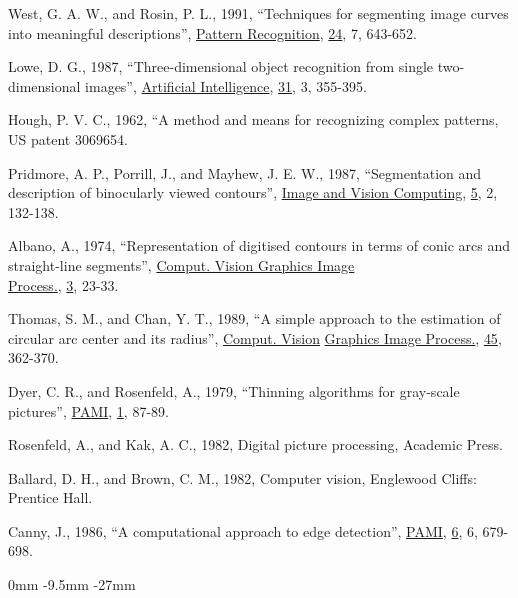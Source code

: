 \begin{thebibliography}{unsrt}

West, G. A. W., and Rosin, P. L., 1991, ``Techniques for segmenting image
curves into meaningful descriptions'', \underline{Pattern Recognition},
\underline{24}, 7, 643-652.

Lowe, D. G., 1987, ``Three-dimensional object recognition from single 
two-dimensional images'', \underline{Artificial Intelligence}, \underline{31}, 
3, 355-395.

Hough, P. V. C., 1962, ``A method and means for recognizing complex patterns, 
US patent 3069654.

Pridmore, A. P., Porrill, J., and Mayhew, J. E. W., 1987, ``Segmentation and 
description of binocularly viewed contours'', \underline{Image and Vision 
Computing}, \underline{5}, 2, 132-138.

Albano, A., 1974, ``Representation of digitised contours in terms of conic arcs
and straight-line segments'', \underline{Comput. Vision Graphics Image} \\
\underline{Process.}, \underline{3}, 23-33.

Thomas, S. M., and Chan, Y. T., 1989, ``A simple approach to the estimation of
circular arc center and its radius'', \underline{Comput. Vision} 
\underline{Graphics Image Process.}, \underline{45}, 362-370.

Dyer, C. R., and Rosenfeld, A., 1979, ``Thinning algorithms for gray-scale 
pictures'', \underline{PAMI}, \underline{1}, 87-89.

Rosenfeld, A., and Kak, A. C., 1982, Digital picture processing, 
Academic Press.

Ballard, D. H., and Brown, C. M., 1982, Computer vision, Englewood Cliffs: 
Prentice Hall. 

Canny, J., 1986, ``A computational approach to edge detection'', 
\underline{PAMI}, \underline{6}, 6, 679-698.

\end{thebibliography}

\clearpage

\setlength{\evensidemargin} {0mm}
\setlength{\oddsidemargin}  {-9.5mm}
\setlength{\topmargin} {-27mm}

